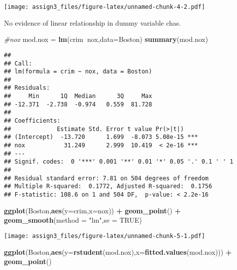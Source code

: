 \documentclass[]{article}
\newenvironment{Shaded}{\begin{snugshade}}{\end{snugshade}}
\newcommand{\CommentTok}[1]{\textcolor[rgb]{0.56,0.35,0.01}{\textit{#1}}}
\newcommand{\DataTypeTok}[1]{\textcolor[rgb]{0.13,0.29,0.53}{#1}}
\newcommand{\KeywordTok}[1]{\textcolor[rgb]{0.13,0.29,0.53}{\textbf{#1}}}
\newcommand{\NormalTok}[1]{#1}
\newcommand{\OperatorTok}[1]{\textcolor[rgb]{0.81,0.36,0.00}{\textbf{#1}}}
\newcommand{\OtherTok}[1]{\textcolor[rgb]{0.56,0.35,0.01}{#1}}
\newcommand{\StringTok}[1]{\textcolor[rgb]{0.31,0.60,0.02}{#1}}
\begin{document}
\texttt{[image: assign3\_files/figure-latex/unnamed-chunk-4-2.pdf]}

No evidence of linear relationship in dummy variable chas.

\begin{Shaded}
\begin{Highlighting}[]
\CommentTok{#nox}
\NormalTok{mod.nox =}\StringTok{ }\KeywordTok{lm}\NormalTok{(crim}\OperatorTok{~}\NormalTok{nox,}\DataTypeTok{data=}\NormalTok{Boston)}
\KeywordTok{summary}\NormalTok{(mod.nox)}
\end{Highlighting}
\end{Shaded}

\begin{verbatim}
## 
## Call:
## lm(formula = crim ~ nox, data = Boston)
## 
## Residuals:
##     Min      1Q  Median      3Q     Max 
## -12.371  -2.738  -0.974   0.559  81.728 
## 
## Coefficients:
##             Estimate Std. Error t value Pr(>|t|)    
## (Intercept)  -13.720      1.699  -8.073 5.08e-15 ***
## nox           31.249      2.999  10.419  < 2e-16 ***
## ---
## Signif. codes:  0 '***' 0.001 '**' 0.01 '*' 0.05 '.' 0.1 ' ' 1
## 
## Residual standard error: 7.81 on 504 degrees of freedom
## Multiple R-squared:  0.1772, Adjusted R-squared:  0.1756 
## F-statistic: 108.6 on 1 and 504 DF,  p-value: < 2.2e-16
\end{verbatim}

\begin{Shaded}
\begin{Highlighting}[]
\KeywordTok{ggplot}\NormalTok{(Boston,}\KeywordTok{aes}\NormalTok{(}\DataTypeTok{y=}\NormalTok{crim,}\DataTypeTok{x=}\NormalTok{nox)) }\OperatorTok{+}\StringTok{ }\KeywordTok{geom_point}\NormalTok{() }\OperatorTok{+}\StringTok{ }\KeywordTok{geom_smooth}\NormalTok{(}\DataTypeTok{method =} \StringTok{"lm"}\NormalTok{,}\DataTypeTok{se =} \OtherTok{TRUE}\NormalTok{)}
\end{Highlighting}
\end{Shaded}

\texttt{[image: assign3\_files/figure-latex/unnamed-chunk-5-1.pdf]}

\begin{Shaded}
\begin{Highlighting}[]
\KeywordTok{ggplot}\NormalTok{(Boston,}\KeywordTok{aes}\NormalTok{(}\DataTypeTok{y=}\KeywordTok{rstudent}\NormalTok{(mod.nox),}\DataTypeTok{x=}\KeywordTok{fitted.values}\NormalTok{(mod.nox))) }\OperatorTok{+}\StringTok{ }\KeywordTok{geom_point}\NormalTok{() }
\end{Highlighting}
\end{Shaded}
\end{document}
